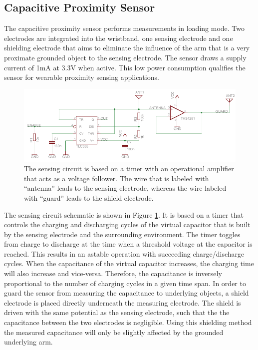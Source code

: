 \documentclass[runningheads,a4paper]{llncs}
\begin{document}
\subsection{Capacitive Proximity Sensor}

The capacitive proximity sensor performs measurements in loading mode. Two electrodes are integrated into the wristband, one sensing electrode and one shielding electrode that aims to eliminate the influence of the arm that is a very proximate grounded object to the sensing electrode. The sensor draws a supply current of 1mA at 3.3V when active. This low power consumption qualifies the sensor for wearable proximity sensing applications. 

\begin{figure}
	\centering
		\includegraphics[width=1.00\textwidth]{Images/schematic.pdf}
	\caption{The sensing circuit is based on a timer with an operational amplifier that acts as a voltage follower. The wire that is labeled with ``antenna'' leads to the sensing electrode, whereas the wire labeled with ``guard'' leads to the shield electrode.}
	\label{fig:schematic}
\end{figure}

The sensing circuit schematic is shown in Figure \ref{fig:schematic}. It is based on a timer that controls the charging and discharging cycles of the virtual capacitor that is built by the sensing electrode and the surrounding environment. The timer toggles from charge to discharge at the time when a threshold voltage at the capacitor is reached. This results in an astable operation with succeeding charge/discharge cycles. When the capacitance of the virtual capacitor increases, the charging time will also increase and vice-versa. Therefore, the capacitance is inversely proportional to the number of charging cycles in a given time span. In order to guard the sensor from measuring the capacitance to underlying objects, a shield electrode is placed directly underneath the measuring electrode. The shield is driven with the same potential as the sensing electrode, such that the the capacitance between the two electrodes is negligible. Using this shielding method the measured capacitance will only be slightly 
affected by the grounded underlying arm.
\end{document}
